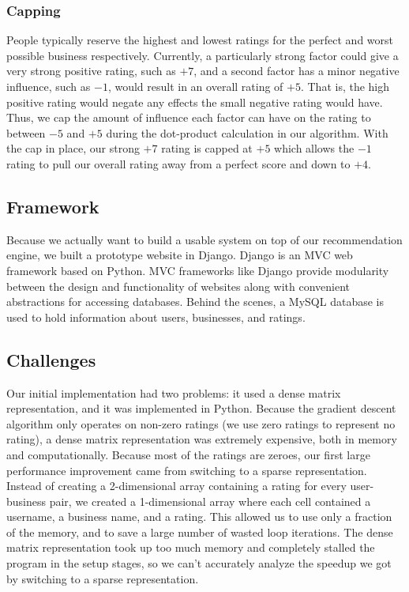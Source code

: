 \subsubsection{Capping}

People typically reserve the highest and lowest ratings for the perfect and
worst possible business respectively. Currently, a particularly strong factor
could give a very strong positive rating, such as $+7$, and a second factor has
a minor negative influence, such as $-1$, would result in an overall rating of
$+5$. That is, the high positive rating would negate any effects the small
negative rating would have. Thus, we cap the amount of influence each factor
can have on the rating to between $-5$ and $+5$ during the dot-product calculation
in our algorithm. With the cap in place, our
strong $+7$ rating is capped at $+5$ which allows the $-1$ rating to pull our
overall rating away from a perfect score and down to $+4$. \cite{funk}

\subsection{Framework}

Because we actually want to build a usable system on top of our recommendation
engine, we built a prototype website in Django\cite{django}. Django is an MVC web framework
based on Python. MVC frameworks like Django provide modularity between the design and 
functionality of websites along with convenient abstractions for accessing databases. 
Behind the scenes,
a MySQL database is used to hold information about users, businesses, and ratings.

\subsection{Challenges}

Our initial implementation had two problems: it used a dense matrix
representation, and it was implemented in Python. Because the gradient descent
algorithm only operates on non-zero ratings (we use zero ratings to represent
no rating), a dense matrix representation was extremely expensive, both in
memory and computationally. Because most of the ratings are zeroes, our first
large performance improvement came from switching to a sparse representation.
Instead of creating a 2-dimensional array containing a rating for every
user-business pair, we created a 1-dimensional array where each cell contained a
username, a business name, and a rating. This allowed us to use only a fraction
of the memory, and to save a large number of wasted loop iterations. The dense
matrix representation took up too much memory and completely stalled the program
in the setup stages, so we can't accurately analyze the speedup we got by
switching to a sparse representation.

